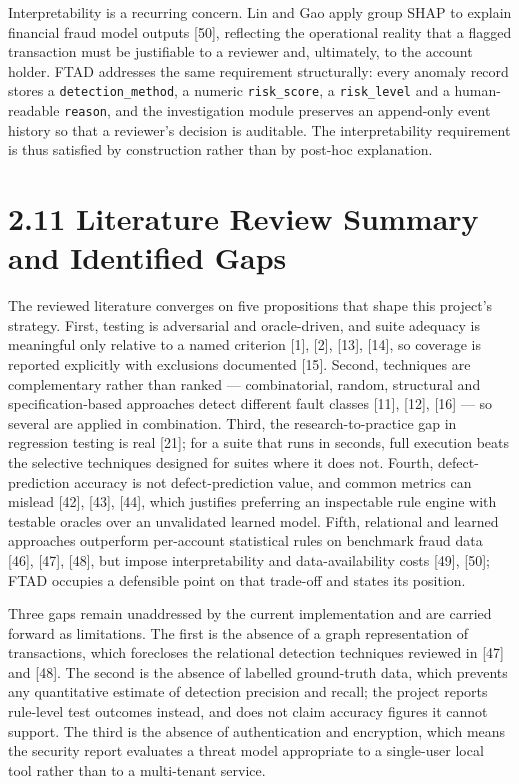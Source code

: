 \documentclass[
  12pt,
]{report}
\begin{document}
Interpretability is a recurring concern. Lin and Gao apply group SHAP to
explain financial fraud model outputs {[}50{]}, reflecting the
operational reality that a flagged transaction must be justifiable to a
reviewer and, ultimately, to the account holder. FTAD addresses the same
requirement structurally: every anomaly record stores a
\texttt{detection\_method}, a numeric \texttt{risk\_score}, a
\texttt{risk\_level} and a human-readable \texttt{reason}, and the
investigation module preserves an append-only event history so that a
reviewer's decision is auditable. The interpretability requirement is
thus satisfied by construction rather than by post-hoc explanation.

\section{2.11 Literature Review Summary and Identified
Gaps}\label{literature-review-summary-and-identified-gaps}

The reviewed literature converges on five propositions that shape this
project's strategy. First, testing is adversarial and oracle-driven, and
suite adequacy is meaningful only relative to a named criterion {[}1{]},
{[}2{]}, {[}13{]}, {[}14{]}, so coverage is reported explicitly with
exclusions documented {[}15{]}. Second, techniques are complementary
rather than ranked --- combinatorial, random, structural and
specification-based approaches detect different fault classes {[}11{]},
{[}12{]}, {[}16{]} --- so several are applied in combination. Third, the
research-to-practice gap in regression testing is real {[}21{]}; for a
suite that runs in seconds, full execution beats the selective
techniques designed for suites where it does not. Fourth,
defect-prediction accuracy is not defect-prediction value, and common
metrics can mislead {[}42{]}, {[}43{]}, {[}44{]}, which justifies
preferring an inspectable rule engine with testable oracles over an
unvalidated learned model. Fifth, relational and learned approaches
outperform per-account statistical rules on benchmark fraud data
{[}46{]}, {[}47{]}, {[}48{]}, but impose interpretability and
data-availability costs {[}49{]}, {[}50{]}; FTAD occupies a defensible
point on that trade-off and states its position.

Three gaps remain unaddressed by the current implementation and are
carried forward as limitations. The first is the absence of a graph
representation of transactions, which forecloses the relational
detection techniques reviewed in {[}47{]} and {[}48{]}. The second is
the absence of labelled ground-truth data, which prevents any
quantitative estimate of detection precision and recall; the project
reports rule-level test outcomes instead, and does not claim accuracy
figures it cannot support. The third is the absence of authentication
and encryption, which means the security report evaluates a threat model
appropriate to a single-user local tool rather than to a multi-tenant
service.
\end{document}
